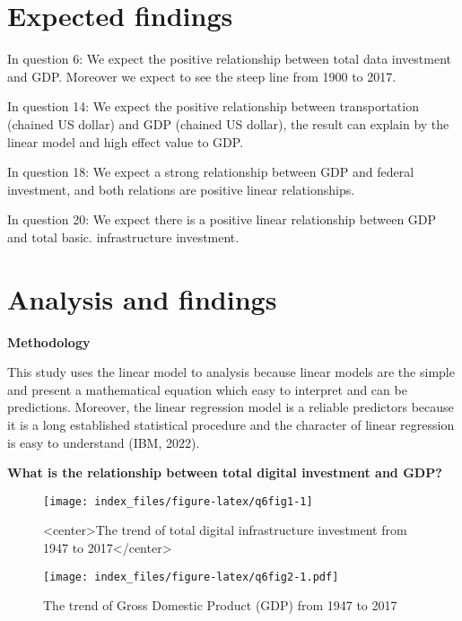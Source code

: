\documentclass[
]{article}
\begin{document}
\hypertarget{expected-findings}{%
\section{Expected findings}\label{expected-findings}}

In question 6: We expect the positive relationship between total data investment and GDP. Moreover we expect to see the steep line from 1900 to 2017.

In question 14: We expect the positive relationship between transportation (chained US dollar) and GDP (chained US dollar), the result can explain by the linear model and high effect value to GDP.

In question 18: We expect a strong relationship between GDP and federal investment, and both relations are positive linear relationships.

In question 20: We expect there is a positive linear relationship between GDP and total basic. infrastructure investment.

\hypertarget{analysis-and-findings}{%
\section{Analysis and findings}\label{analysis-and-findings}}

\textbf{Methodology}

This study uses the linear model to analysis because linear models are the simple and present a mathematical equation which easy to interpret and can be predictions. Moreover, the linear regression model is a reliable predictors because it is a long established statistical procedure and the character of linear regression is easy to understand (IBM, 2022).

\textbf{What is the relationship between total digital investment and GDP?}

\begin{figure}

{\centering \texttt{[image: index\_files/figure-latex/q6fig1-1]} 

}

\caption{<center>The trend of total digital infrastructure investment from 1947 to 2017</center>}\label{fig:q6fig1}
\end{figure}

\begin{figure}
\centering
\texttt{[image: index\_files/figure-latex/q6fig2-1.pdf]}
\caption{\label{fig:q6fig2}The trend of Gross Domestic Product (GDP) from 1947 to 2017}
\end{figure}
\end{document}
